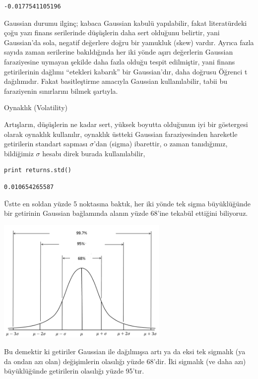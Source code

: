 \documentclass[12pt,fleqn]{article}\usepackage{../../common}
\begin{document}
\begin{verbatim}
-0.0177541105196
\end{verbatim}

Gaussian durumu ilginç; kabaca Gaussian kabulü yapılabilir, fakat literatürdeki
çoğu yazı finans serilerinde düşüşlerin daha sert olduğunu belirtir, yani
Gaussian'da sola, negatif değerlere doğru bir yamukluk (skew) vardır. Ayrıca
fazla sayıda zaman serilerine bakıldığında her iki yönde aşırı değerlerin
Gaussian faraziyesine uymayan şekilde daha fazla olduğu tespit edilmiştir, yani
finans getirilerinin dağlımı ``etekleri kabarık'' bir Gaussian'dır, daha doğrusu
Öğrenci t dağılımıdır. Fakat basitleştirme amacıyla Gaussian kullanılabilir,
tabii bu faraziyenin sınırlarını bilmek şartıyla.

Oynaklık (Volatility)

Artışların, düşüşlerin ne kadar sert, yüksek boyutta olduğunun iyi bir
göstergesi olarak oynaklık kullanılır, oynaklık üstteki Gaussian faraziyesinden
hareketle getirilerin standart sapması $\sigma$'dan (sigma) ibarettir, o zaman
tanıdığımız, bildiğimiz $\sigma$ hesabı direk burada kullanılabilir,

\begin{verbatim}
print returns.std()
\end{verbatim}

\begin{verbatim}
0.010654265587
\end{verbatim}

Üstte en soldan yüzde 5 noktasına baktık, her iki yönde tek sigma büyüklüğünde
bir getirinin Gaussian bağlamında alanın yüzde 68'ine tekabül ettiğini
biliyoruz.

\includegraphics[height=6cm]{gausspercentiles.png}

Bu demektir ki getiriler Gaussian ile dağılmışsa artı ya da eksi tek sigmalık
(ya da ondan azı olan) değişimlerin olasılığı yüzde 68'dir. İki sigmalık (ve
daha azı) büyüklüğünde getirilerin olasılığı yüzde 95'tır.
\end{document}
